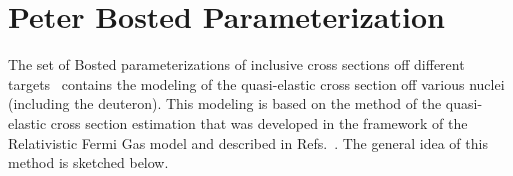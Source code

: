 
\newpage
\chapter{Peter Bosted Parameterization}
\mbox{}\vspace{-\baselineskip}


The set of Bosted parameterizations of inclusive cross sections off different targets~\cite{Bosted_fit,Bosted:2007xd} contains the modeling of the quasi-elastic cross section off various nuclei (including the deuteron). This modeling is based on the method of the quasi-elastic cross section estimation that was developed in the framework of the Relativistic Fermi Gas model and described in Refs.~\cite{Amaro:2004bs,Alberico:1988bv,Donnelly:1998xg}. The general idea of this method is sketched below. 

